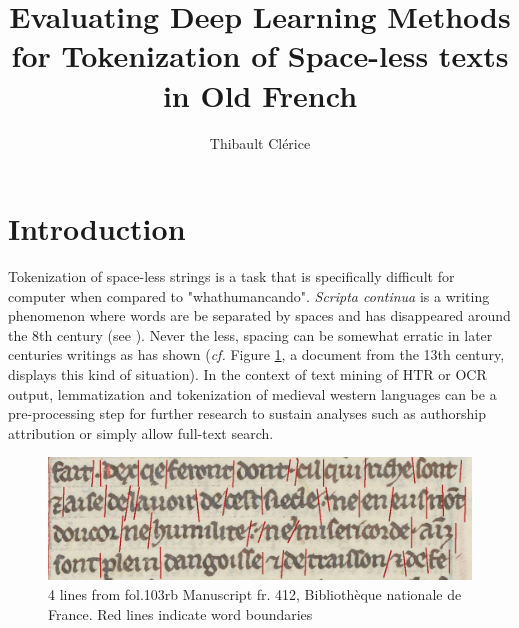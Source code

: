 \documentclass{jdmdh}
\title{Evaluating Deep Learning Methods for Tokenization of Space-less texts in Old French}
\author[1]{Thibault Clérice}
\affil[1]{École nationale des Chartes, France}
\affil[2]{Université Lyon 3, France}
\begin{document}
\maketitle



\section{Introduction}


Tokenization of space-less strings is a task that is specifically difficult for computer when compared to "whathumancando". \textit{Scripta continua} is a writing phenomenon where words are be separated by spaces and has disappeared around the 8th century (see \citet{zanna1998lecture}). Never the less, spacing can be somewhat erratic in later centuries writings as \citet{stutzmann} has shown (\textit{cf.} Figure \ref{fig:4lines}, a document from the 13th century, displays this kind of situation). In the context of text mining of HTR or OCR output, lemmatization and tokenization of medieval western languages can be a pre-processing step for further research to sustain analyses such as authorship attribution or simply allow full-text search.

\begin{figure}[!ht]
  \centering
  \includegraphics[width=\linewidth]{4-lines-p0215.png}

  \caption{ 4 lines from fol.103rb Manuscript fr. 412, Bibliothèque nationale de France.  Red lines indicate word boundaries}
  \label{fig:4lines}
\end{figure}
\end{document}
